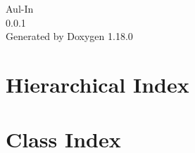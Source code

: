 \documentclass[twoside]{book}
\newcommand{\+}{\discretionary{\mbox{\scriptsize$\hookleftarrow$}}{}{}}
\newcommand{\clearemptydoublepage}{%
    \newpage{\pagestyle{empty}\cleardoublepage}%
  }
\begin{document}
  \raggedbottom
    \hypersetup{pageanchor=false,
                bookmarksnumbered=true,
                pdfencoding=unicode
               }
  \begin{titlepage}
  \vspace*{7cm}
  \begin{center}%
  {\Large Aul-\/\+In}\\
  [1ex]\large 0.\+0.\+1 \\
  \vspace*{1cm}
  {\large Generated by Doxygen 1.18.0}\\
  \end{center}
  \end{titlepage}
  \clearemptydoublepage
  \tableofcontents
  \clearemptydoublepage
  \hypersetup{pageanchor=true}

\chapter{Hierarchical Index}

\chapter{Class Index}

\end{document}
